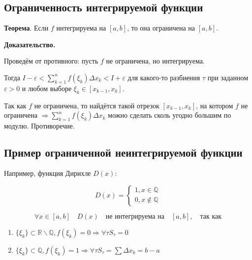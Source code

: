 \documentclass[a4paper]{article}
\begin{document}
\begin{definit}
\subsection*{Ограниченность интегрируемой функции}

\begin{htheorem}\textbf{Теорема}.
Если $f$ интегрируема на $[a,b]$, то она ограничена на $[a,b]$.

\end{htheorem}

\begin{hproof}\textbf{Доказательство.}

Проведём от противного: пусть $f$ не ограничена, но интегрируема.

Тогда $I - \varepsilon < \sum_{k=1}^n f(\xi_k) \Delta x_k < I + \varepsilon$ для какого-то разбиения $\tau$ при заданном $\varepsilon > 0$ и любом выборе $\xi_k \in [x_{k-1}, x_k]$.

Так как $f$ не ограничена, то найдётся такой отрезок $[x_{k-1}, x_k]$, на котором $f$ не ограничена $\Rightarrow \sum_{k=1}^n f(\xi_k) \Delta x_k $ можно сделать сколь угодно большим по модулю. Противоречие.
\end{hproof}

\end{definit}


\begin{definit}
\subsection*{Пример ограниченной неинтегрируемой функции}

Например, функция Дирихле $D(x)$:

\[
	D(x) = \begin{cases}
		1, x \in \mathbb{Q} \\
		0, x \notin \mathbb{Q}
	\end{cases}
\]

\[
	\forall x \in [a,b] \quad D(x) \quad \text{не интегрируема на} \quad  [a, b], \quad \text{так как}
\]

\begin{enumerate}
\item $\{ \xi_k \} \subset \mathbb{R} \backslash \mathbb{Q}, f(\xi_k) = 0 \Rightarrow \forall \tau S_\tau = 0$
\item $\{ \xi_k \} \subset \mathbb{Q}, f(\xi_k) = 1 \Rightarrow \forall \tau S_\tau = \sum \Delta x_k = b - a$
\end{enumerate}
\end{definit}
\end{document}
